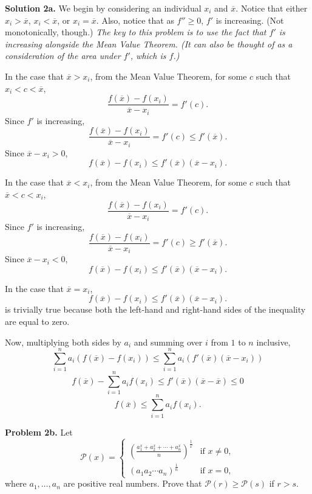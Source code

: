\documentclass{article}
\begin{document}
\bigskip

\noindent\textbf{Solution 2a.} We begin by considering an individual $x_i$ and $\overline{x}$. Notice that either $x_i > \overline{x}$, $x_i < \overline{x}$, or $x_i = \overline{x}$. Also, notice that as $f'' \geq 0$, $f'$ is increasing. (Not monotonically, though.) \textit{The key to this problem is to use the fact that $f'$ is increasing alongside the Mean Value Theorem. (It can also be thought of as a consideration of the area under $f'$, which is $f$.)}

In the case that $\overline{x} > x_i$, from the Mean Value Theorem, for some $c$ such that $x_i < c < \overline{x}$,
\[
    \frac{f(\overline{x}) - f(x_i)}{\overline{x} - x_i} = f'(c) \text{.}
\]
Since $f'$ is increasing,
\[
    \frac{f(\overline{x}) - f(x_i)}{\overline{x} - x_i} = f'(c) \leq f'(\overline{x}) \text{.}
\]
Since $\overline{x} - x_i > 0$,
\[
    f(\overline{x}) - f(x_i) \leq f'(\overline{x})(\overline{x} - x_i) \text{.}
\]

\bigskip

In the case that $\overline{x} < x_i$, from the Mean Value Theorem, for some $c$ such that $\overline{x} < c < x_i$,
\[
    \frac{f(\overline{x}) - f(x_i)}{\overline{x} - x_i} = f'(c) \text{.}
\]
Since $f'$ is increasing,
\[
    \frac{f(\overline{x}) - f(x_i)}{\overline{x} - x_i} = f'(c) \geq f'(\overline{x}) \text{.}
\]
Since $\overline{x} - x_i < 0$,
\[
    f(\overline{x}) - f(x_i) \leq f'(\overline{x})(\overline{x} - x_i) \text{.}
\]

\bigskip

In the case that $\overline{x} = x_i$,
\[
    f(\overline{x}) - f(x_i) \leq f'(\overline{x})(\overline{x} - x_i) \text{.}
\]
is trivially true because both the left-hand and right-hand sides of the inequality are equal to zero.

\bigskip

Now, multiplying both sides by $a_i$ and summing over $i$ from $1$ to $n$ inclusive,
\[
    \sum_{i=1}^n a_i \left( f(\overline{x}) - f(x_i) \right) \leq \sum_{i=1}^n a_i \left( f'(\overline{x})(\overline{x} - x_i) \right)
\]
\[
    f(\overline{x}) - \sum_{i=1}^n a_i f(x_i) \leq f'(\overline{x})(\overline{x} - \overline{x}) \leq 0
\]
\[
    f(\overline{x}) \leq \sum_{i=1}^n a_i f(x_i) \text{.}
\]

\bigskip

\noindent\textbf{Problem 2b.} Let
\[
  \mathcal{P}(x) =
  \begin{cases}
    \left( \frac{a_1^x + a_2^x + \cdots + a_n^x}{n} \right)^\frac{1}{x} & \text{if } x \neq 0, \\
    (a_1 a_2 \cdots a_n)^\frac{1}{n} & \text{if } x = 0 \text{,}
  \end{cases}
\]
where $a_1, \dots, a_n$ are positive real numbers. Prove that $\mathcal{P}(r) \geq \mathcal{P}(s)$ if $r > s$.
\end{document}
